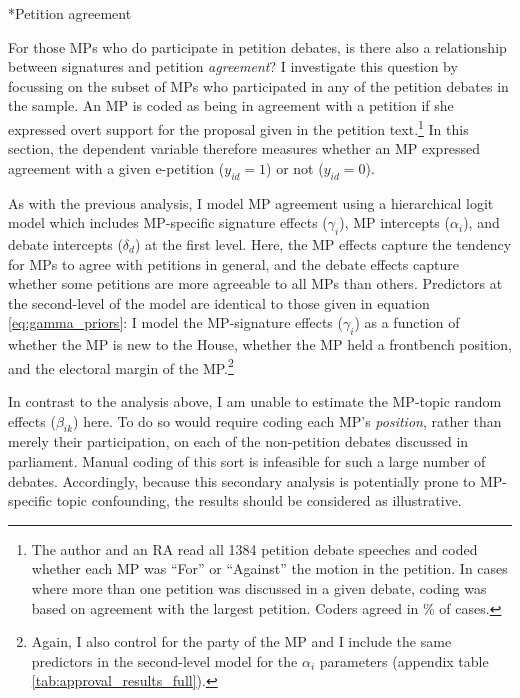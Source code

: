 \documentclass[12pt]{article}
\makeatletter
\renewcommand{\section}{\@startsection{section}{1}{0mm}{-\baselineskip}{0.20\baselineskip}{\centering\normalfont\normalsize\scshape}}
\makeatother
\begin{document}
\section*{Petition agreement}

For those MPs who do participate in petition debates, is there also a relationship between signatures and petition \emph{agreement}?  I investigate this question by focussing on the subset of  MPs who participated in any of the petition debates in the sample. An MP is coded as being in agreement with a petition if she expressed overt support for the proposal given in the petition text.\footnote{The author and an RA read all 1384 petition debate speeches and coded whether each MP was ``For'' or ``Against'' the motion in the petition. In cases where more than one petition was discussed in a given debate, coding was based on agreement with the largest petition. Coders agreed in \% of cases.} In this section, the dependent variable therefore measures whether an MP expressed agreement with a given e-petition ($y_{id} = 1$) or not ($y_{id} = 0$). 

As with the previous analysis, I model MP agreement using a hierarchical logit model which includes MP-specific signature effects ($\gamma_i$), MP intercepts ($\alpha_i$), and debate intercepts ($\delta_d$) at the first level. Here, the MP effects capture the tendency for MPs to agree with petitions in general, and the debate effects capture whether some petitions are more agreeable to all MPs than others. Predictors at the second-level of the model are identical to those given in equation \ref{eq:gamma_priors}: I model the MP-signature effects ($\gamma_i$) as a function of whether the MP is new to the House, whether the MP held a frontbench position, and the electoral margin of the MP.\footnote{Again, I also control for the party of the MP and I include the same predictors in the second-level model for the $\alpha_i$ parameters (appendix table \ref{tab:approval_results_full}).}

In contrast to the analysis above, I am unable to estimate the MP-topic random effects ($\beta_{ik}$) here. To do so would require coding each MP's \emph{position}, rather than merely their participation, on each of the non-petition debates discussed in parliament. Manual coding of this sort is infeasible for such a large number of debates.  Accordingly, because this secondary analysis is potentially prone to MP-specific topic confounding, the results should be considered as illustrative. 
\end{document}
